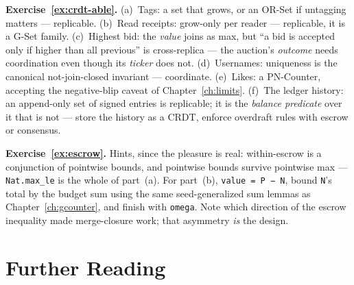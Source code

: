 \documentclass[12pt, a4paper, openright]{book}
\theoremstyle{thmstyle}
\theoremstyle{defstyle}
\newcommand{\lc}[1]{\texttt{#1}}
\begin{document}
\textbf{Exercise~\ref{ex:crdt-able}.} (a)~Tags: a set that grows, or an
OR-Set if untagging matters --- replicable. (b)~Read receipts:
grow-only per reader --- replicable, it is a G-Set family. (c)~Highest
bid: the \emph{value} joins as max, but ``a bid is accepted only if
higher than all previous'' is cross-replica --- the auction's
\emph{outcome} needs coordination even though its \emph{ticker} does
not. (d)~Usernames: uniqueness is the canonical not-join-closed
invariant --- coordinate. (e)~Likes: a PN-Counter, accepting the
negative-blip caveat of Chapter~\ref{ch:limits}. (f)~The ledger
history: an append-only set of signed entries is replicable; it is the
\emph{balance predicate} over it that is not --- store the history as a
CRDT, enforce overdraft rules with escrow or consensus.

\textbf{Exercise~\ref{ex:escrow}.} Hints, since the pleasure is real:
within-escrow is a conjunction of pointwise bounds, and pointwise
bounds survive pointwise max --- \lc{Nat.max_le} is the whole of
part~(a). For part~(b), \lc{value = P − N}, bound \lc{N}'s total by the
budget sum using the same seed-generalized sum lemmas as
Chapter~\ref{ch:gcounter}, and finish with \lc{omega}. Note which
direction of the escrow inequality made merge-closure work; that
asymmetry \emph{is} the design.

\FloatBarrier
\chapter*{Further Reading}
\end{document}
